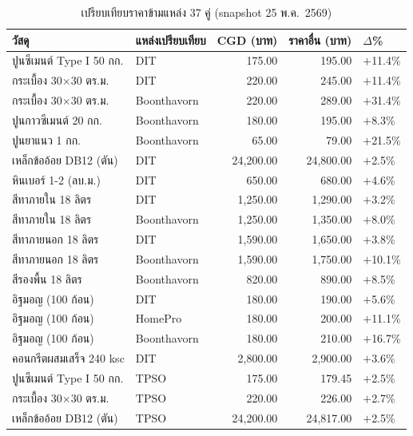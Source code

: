 \begin{table}[H]
  \centering
  \footnotesize
  \caption{เปรียบเทียบราคาข้ามแหล่ง 37 คู่ (snapshot 25 พ.ค.\ 2569)}
  \label{tab:valid-result}
  \begin{tabular}{llrrl}
    \toprule
    วัสดุ & แหล่งเปรียบเทียบ & CGD (บาท) & ราคาอื่น (บาท) & $\Delta$\% \\
    \midrule
    ปูนซีเมนต์ Type I 50 กก.  & DIT         & 175.00 & 195.00 & $+$11.4\% \\
    กระเบื้อง 30$\times$30 ตร.ม. & DIT      & 220.00 & 245.00 & $+$11.4\% \\
    กระเบื้อง 30$\times$30 ตร.ม. & Boonthavorn & 220.00 & 289.00 & $+$31.4\% \\
    ปูนกาวซีเมนต์ 20 กก.      & Boonthavorn & 180.00 & 195.00 & $+$8.3\% \\
    ปูนยาแนว 1 กก.             & Boonthavorn & 65.00  & 79.00  & $+$21.5\% \\
    เหล็กข้ออ้อย DB12 (ตัน)   & DIT         & 24{,}200.00 & 24{,}800.00 & $+$2.5\% \\
    หินเบอร์ 1-2 (ลบ.ม.)       & DIT         & 650.00 & 680.00 & $+$4.6\% \\
    สีทาภายใน 18 ลิตร          & DIT         & 1{,}250.00 & 1{,}290.00 & $+$3.2\% \\
    สีทาภายใน 18 ลิตร          & Boonthavorn & 1{,}250.00 & 1{,}350.00 & $+$8.0\% \\
    สีทาภายนอก 18 ลิตร         & DIT         & 1{,}590.00 & 1{,}650.00 & $+$3.8\% \\
    สีทาภายนอก 18 ลิตร         & Boonthavorn & 1{,}590.00 & 1{,}750.00 & $+$10.1\% \\
    สีรองพื้น 18 ลิตร           & Boonthavorn & 820.00 & 890.00 & $+$8.5\% \\
    อิฐมอญ (100 ก้อน)          & DIT         & 180.00 & 190.00 & $+$5.6\% \\
    อิฐมอญ (100 ก้อน)          & HomePro     & 180.00 & 200.00 & $+$11.1\% \\
    อิฐมอญ (100 ก้อน)          & Boonthavorn & 180.00 & 210.00 & $+$16.7\% \\
    คอนกรีตผสมเสร็จ 240 ksc   & DIT         & 2{,}800.00 & 2{,}900.00 & $+$3.6\% \\
    ปูนซีเมนต์ Type I 50 กก.  & TPSO        & 175.00 & 179.45 & $+$2.5\% \\
    กระเบื้อง 30$\times$30 ตร.ม. & TPSO     & 220.00 & 226.00 & $+$2.7\% \\
    เหล็กข้ออ้อย DB12 (ตัน)   & TPSO        & 24{,}200.00 & 24{,}817.00 & $+$2.5\% \\

\end{tabular}
\end{table}
